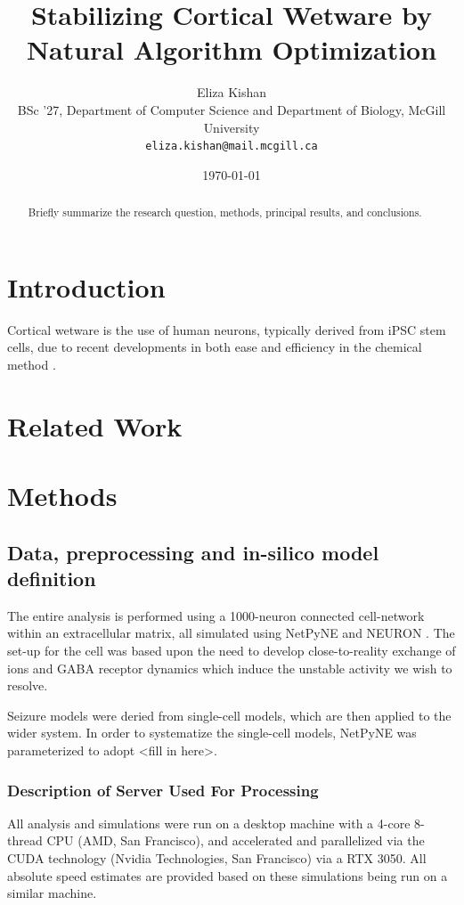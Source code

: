 \documentclass[11pt,a4paper]{article}
\title{ Stabilizing Cortical Wetware by Natural Algorithm Optimization }
\author{Eliza Kishan\\
	\small BSc '27, Department of Computer Science and Department of Biology, McGill University \\
	\small \texttt{eliza.kishan@mail.mcgill.ca}}
\date{\today}
\begin{document}
\maketitle

\begin{abstract}
Briefly summarize the research question, methods, principal results, and conclusions.
\end{abstract}

\section{Introduction}
Cortical wetware is the use of human neurons, typically derived from iPSC stem cells, due to recent developments in both ease and efficiency in the chemical
method \cite{ipscneuron}.

\section{Related Work}


\section{Methods}
\subsection{Data, preprocessing and in-silico model definition}

The entire analysis is performed using a 1000-neuron connected cell-network
within an extracellular matrix, all simulated using NetPyNE and NEURON \cite{neuron} \cite{netpyne}. The set-up for the cell
was based upon the need to develop close-to-reality exchange of ions and GABA receptor dynamics which induce the unstable activity
we wish to resolve. 

Seizure models were deried from single-cell models, which are then applied to the wider system. In order to systematize the single-cell models,
NetPyNE was parameterized to adopt <fill in here>.

\subsubsection*{Description of Server Used For Processing}
All analysis and simulations were run on a desktop machine with a 4-core 8-thread CPU (AMD, San Francisco), and accelerated and parallelized via the CUDA technology (Nvidia Technologies, San Francisco) via a RTX 3050.
All absolute speed estimates are provided based on these simulations being run on a similar machine.
\end{document}
